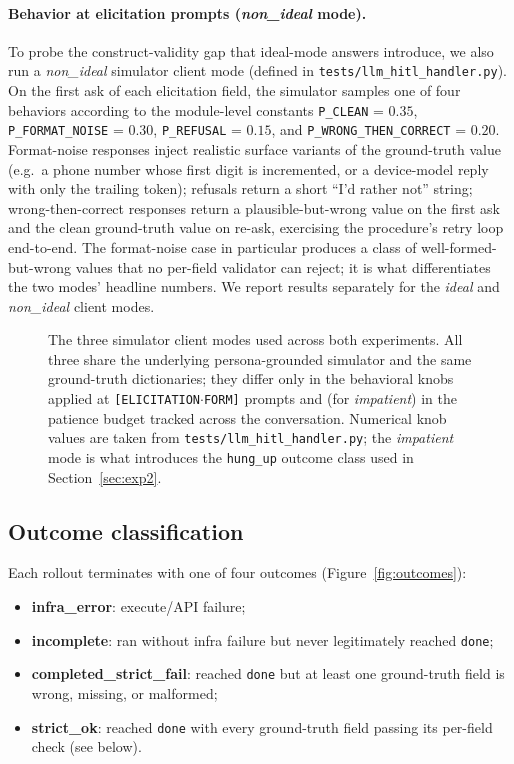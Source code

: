 \documentclass[11pt,a4paper]{article}
\begin{document}
\paragraph{Behavior at elicitation prompts (\emph{non\_ideal} mode).}
To probe the construct-validity gap that ideal-mode answers introduce, we also run a \emph{non\_ideal} simulator client mode (defined in \texttt{tests/llm\_hitl\_handler.py}). On the first ask of each elicitation field, the simulator samples one of four behaviors according to the module-level constants \texttt{P\_CLEAN} = $0.35$, \texttt{P\_FORMAT\_NOISE} = $0.30$, \texttt{P\_REFUSAL} = $0.15$, and \texttt{P\_WRONG\_THEN\_CORRECT} = $0.20$. Format-noise responses inject realistic surface variants of the ground-truth value (e.g.\ a phone number whose first digit is incremented, or a device-model reply with only the trailing token); refusals return a short ``I'd rather not'' string; wrong-then-correct responses return a plausible-but-wrong value on the first ask and the clean ground-truth value on re-ask, exercising the procedure's retry loop end-to-end. The format-noise case in particular produces a class of well-formed-but-wrong values that no per-field validator can reject; it is what differentiates the two modes' headline numbers. We report results separately for the \emph{ideal} and \emph{non\_ideal} client modes.

\begin{figure}[htbp]
  \centering
  \resizebox{\linewidth}{!}{}
  \caption{The three simulator client modes used across both experiments.
  All three share the underlying persona-grounded simulator and the same
  ground-truth dictionaries; they differ only in the behavioral knobs
  applied at \texttt{[ELICITATION$\cdot$FORM]} prompts and (for
  \emph{impatient}) in the patience budget tracked across the conversation.
  Numerical knob values are taken from
  \texttt{tests/llm\_hitl\_handler.py}; the \emph{impatient} mode is what
  introduces the \texttt{hung\_up} outcome class used in
  Section~\ref{sec:exp2}.}
  \label{fig:simulator-modes}
\end{figure}

\subsection{Outcome classification}

Each rollout terminates with one of four outcomes (Figure~\ref{fig:outcomes}):
\begin{itemize}[noitemsep,leftmargin=2em]
    \item \textbf{infra\_error}: execute/API failure;
    \item \textbf{incomplete}: ran without infra failure but never legitimately reached \texttt{done};
    \item \textbf{completed\_strict\_fail}: reached \texttt{done} but at least one ground-truth field is wrong, missing, or malformed;
    \item \textbf{strict\_ok}: reached \texttt{done} with every ground-truth field passing its per-field check (see below).
\end{itemize}
\end{document}
